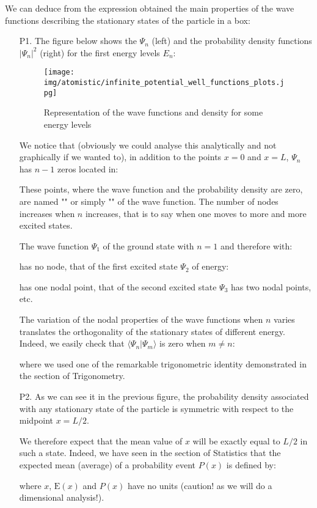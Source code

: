 	We can deduce from the expression obtained the main properties of the wave functions describing the stationary states of the particle in a box:
	\begin{enumerate}
		\item[P1.] The figure below shows the $\Psi_n$ (left) and the probability density functions $|\Psi_n|^2$ (right) for the first energy levels $E_n$:
		\begin{figure}[H]
			\centering
			\texttt{[image: img/atomistic/infinite\_potential\_well\_functions\_plots.jpg]}	
			\caption[]{Representation of the wave functions and density for some energy levels}
		\end{figure}
		We notice that (obviously we could analyse this analytically and not graphically if we wanted to), in addition to the points $x=0$ and $x=L$, $\Psi_n$ has $n-1$ zeros located in:
		
		These points, where the wave function and the probability density are zero, are named "" or simply "" of the wave function. The number of nodes increases when $n$ increases, that is to say when one moves to more and more excited states. 

		The wave function $\Psi_1$ of the ground state with $n = 1$ and therefore with:
		
		has no node, that of the first excited state $\Psi_2$ of energy:
		
		has one nodal point, that of the second excited state $\Psi_3$ has two nodal points, etc.
		
		The variation of the nodal properties of the wave functions when $n$ varies translates the orthogonality of the stationary states of different energy. Indeed, we easily check that $\langle \Psi_n|\Psi_m\rangle$ is zero when $m\neq n$:
		
		where we used one of the remarkable trigonometric identity demonstrated in the section of Trigonometry.
		
		\item[P2.] As we can see it in the previous figure, the probability density associated with any stationary state of the particle is symmetric with respect to the midpoint $x=L/2$.

		We therefore expect that the mean value of $x$ will be exactly equal to $L/2$ in such a state. Indeed, we have seen in the section of Statistics that the expected mean (average) of a probability event $P(x)$ is defined by:
		
		where $x$, $\text{E}(x)$ and $P(x)$ have no units (caution! as we will do a dimensional analysis!).


\end{enumerate}
